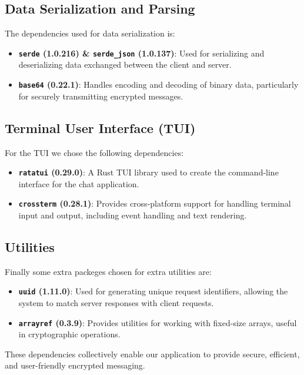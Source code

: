 \subsection{Data Serialization and Parsing}  
\label{subsec:DataSerializatinAndParsin}

The dependencies used for data serialization is:

\begin{itemize}
  \item \textbf{\texttt{serde} (1.0.216) \& \texttt{serde\_json} (1.0.137)}: Used for serializing and deserializing data exchanged between the client and server.
  \item \textbf{\texttt{base64} (0.22.1)}: Handles encoding and decoding of binary data, particularly for securely transmitting encrypted messages.
\end{itemize}

\subsection{Terminal User Interface (TUI)}  
\label{subsed:TerminalUserInterfaceTUI}

For the TUI we chose the following dependencies:

\begin{itemize}
  \item \textbf{\texttt{ratatui} (0.29.0)}: A Rust TUI library used to create the command-line interface for the chat application.
  \item \textbf{\texttt{crossterm} (0.28.1)}: Provides cross-platform support for handling terminal input and output, including event handling and text rendering.
\end{itemize}

\subsection{Utilities}
\label{subsec:Utilities}

Finally some extra packeges chosen for extra utilities are:

\begin{itemize}
  \item \textbf{\texttt{uuid} (1.11.0)}: Used for generating unique request identifiers, allowing the system to match server responses with client requests.
  \item \textbf{\texttt{arrayref} (0.3.9)}: Provides utilities for working with fixed-size arrays, useful in cryptographic operations.
\end{itemize}

These dependencies collectively enable our application to provide secure, efficient, and user-friendly encrypted messaging.  
